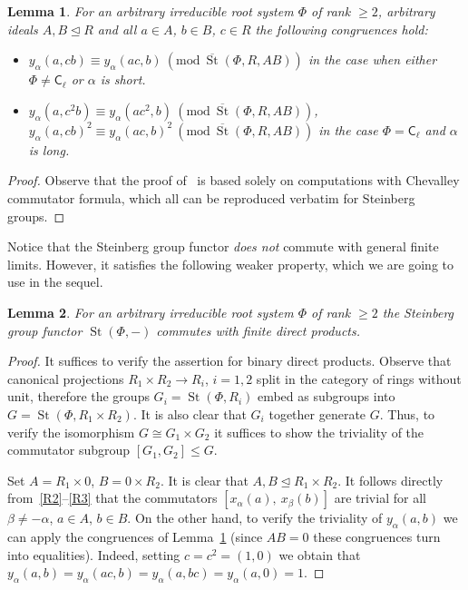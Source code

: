 \documentclass[oneside, 11pt]{amsart}
\numberwithin{equation}{section}
\newtheorem{lemma}{Lemma} \numberwithin{lemma}{section}
\newcommand{\St}{\mathop{\mathrm{St}}\nolimits}
\theoremstyle{definition}
\theoremstyle{definition}
\theoremstyle{remark}
\newcommand{\rC}{\mathsf{C}}
\begin{document}
\begin{lemma} \label{lem:c-identities} For an arbitrary irreducible root system $\Phi$ of rank $\geq 2$, arbitrary ideals $A, B \trianglelefteq R$ and all $a \in A$, $b \in B$, $c \in R$ the following congruences hold:
\begin{itemize}
 \item $y_\alpha(a, cb) \equiv y_\alpha(ac, b)\ (\mathrm{mod}\ \overline{\St}(\Phi, R, AB))$ in the case when either $\Phi \neq \rC_{\ell}$ or $\alpha$ is short.
 \item $y_\alpha(a, c^2b) \equiv y_\alpha(ac^2, b)\ (\mathrm{mod}\ \overline{\St}(\Phi, R, AB))$, $y_\alpha(a, cb)^2 \equiv y_\alpha(ac, b)^2\ (\mathrm{mod}\ \overline{\St}(\Phi, R, AB))$ in the case $\Phi = \rC_{\ell}$ and $\alpha$ is long.
\end{itemize} \end{lemma}
\begin{proof}
 Observe that the proof of~\cite[Theorem~5]{VZ20} is based solely on computations with Chevalley commutator formula, which all can be reproduced verbatim for Steinberg groups.
\end{proof}

Notice that the Steinberg group functor {\it does not} commute with general finite limits. However, it satisfies the following weaker property, which we are going to use in the sequel.
\begin{lemma} \label{lem:fprod} For an arbitrary irreducible root system $\Phi$ of rank $\geq 2$ the Steinberg group functor $\St(\Phi, -)$ commutes with finite direct products. \end{lemma}
\begin{proof} 
It suffices to verify the assertion for binary direct products.
Observe that canonical projections $R_1 \times R_2 \to R_i$, $i=1,2$ split in the category of rings without unit, therefore the groups $G_i = \St(\Phi, R_i)$ embed as subgroups into $G = \St(\Phi, R_1 \times R_2)$. It is also clear that $G_i$ together generate $G$. Thus, to verify the isomorphism $G \cong G_1 \times G_2$ it suffices to show the triviality of the commutator subgroup $[G_1, G_2] \leq G$.

Set $A = R_1\times 0$, $B = 0 \times R_2$. It is clear that $A, B \trianglelefteq R_1 \times R_2$. 
It follows directly from~\eqref{R2}--\eqref{R3} that the commutators $[x_{\alpha}(a),\ x_\beta(b)]$ are trivial for all $\beta \neq -\alpha$, $a \in A$, $b\in B$. On the other hand, to verify the triviality of $y_\alpha(a, b)$ we can apply the congruences of Lemma~\ref{lem:c-identities} (since $AB=0$ these congruences turn into equalities).
Indeed, setting $c = c^2 = (1, 0)$ we obtain that $y_\alpha(a, b) = y_\alpha(ac, b) = y_\alpha(a, bc) = y_\alpha(a, 0) = 1$. \end{proof}
\end{document}
